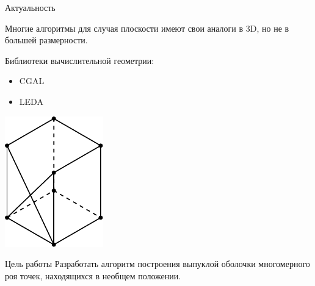 \documentclass[]{beamer} %
\begin{document}
 \begin{frame}{Актуальность}

        \vspace{0.5cm}


             Многие алгоритмы для случая плоскости имеют свои аналоги в 3D, но не в большей размерности.
        \vspace{0.25cm}

        Библиотеки вычислительной геометрии:
        \begin{itemize}
            \item  CGAL
            \item  LEDA
        \end{itemize}
        \vfill
        \begin{center}
            \hspace{10mm}
            \includegraphics[width=0.3\linewidth]{wrongCube.pdf}
        \end{center}
        \vfill
\end{frame}

\begin{frame}{Цель работы}
    Разработать алгоритм построения выпуклой оболочки многомерного роя точек, находящихся в необщем положении.
\end{frame}
\end{document}
